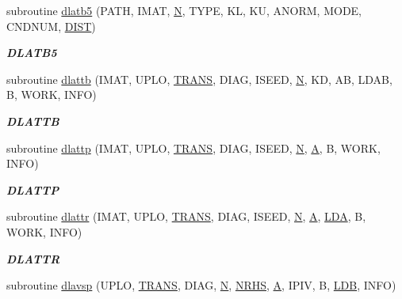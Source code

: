 \begin{DoxyCompactItemize}
subroutine \hyperlink{group__double__lin_ga87397a95770a6cbbe46933bbac6ff7c7}{dlatb5} (P\+A\+T\+H, I\+M\+A\+T, \hyperlink{polmisc_8c_a0240ac851181b84ac374872dc5434ee4}{N}, T\+Y\+P\+E, K\+L, K\+U, A\+N\+O\+R\+M, M\+O\+D\+E, C\+N\+D\+N\+U\+M, \hyperlink{superlu__enum__consts_8h_af00a42ecad444bbda75cde1b64bd7e72ac04fbbdf0d80a4ad25e565541deeebd7}{D\+I\+S\+T})
\begin{DoxyCompactList}\small\item\em {\bfseries D\+L\+A\+T\+B5} \end{DoxyCompactList}\item 
subroutine \hyperlink{group__double__lin_gaef20b8ac00287c0f935b061ebe2c9fdf}{dlattb} (I\+M\+A\+T, U\+P\+L\+O, \hyperlink{superlu__enum__consts_8h_a0c4e17b2d5cea33f9991ccc6a6678d62a1f61e3015bfe0f0c2c3fda4c5a0cdf58}{T\+R\+A\+N\+S}, D\+I\+A\+G, I\+S\+E\+E\+D, \hyperlink{polmisc_8c_a0240ac851181b84ac374872dc5434ee4}{N}, K\+D, A\+B, L\+D\+A\+B, B, W\+O\+R\+K, I\+N\+F\+O)
\begin{DoxyCompactList}\small\item\em {\bfseries D\+L\+A\+T\+T\+B} \end{DoxyCompactList}\item 
subroutine \hyperlink{group__double__lin_ga93a6183a22b3a220dbca5e5b2496ade1}{dlattp} (I\+M\+A\+T, U\+P\+L\+O, \hyperlink{superlu__enum__consts_8h_a0c4e17b2d5cea33f9991ccc6a6678d62a1f61e3015bfe0f0c2c3fda4c5a0cdf58}{T\+R\+A\+N\+S}, D\+I\+A\+G, I\+S\+E\+E\+D, \hyperlink{polmisc_8c_a0240ac851181b84ac374872dc5434ee4}{N}, \hyperlink{classA}{A}, B, W\+O\+R\+K, I\+N\+F\+O)
\begin{DoxyCompactList}\small\item\em {\bfseries D\+L\+A\+T\+T\+P} \end{DoxyCompactList}\item 
subroutine \hyperlink{group__double__lin_ga291d45fd8b1b6b5a6b97fa394fd0affd}{dlattr} (I\+M\+A\+T, U\+P\+L\+O, \hyperlink{superlu__enum__consts_8h_a0c4e17b2d5cea33f9991ccc6a6678d62a1f61e3015bfe0f0c2c3fda4c5a0cdf58}{T\+R\+A\+N\+S}, D\+I\+A\+G, I\+S\+E\+E\+D, \hyperlink{polmisc_8c_a0240ac851181b84ac374872dc5434ee4}{N}, \hyperlink{classA}{A}, \hyperlink{example__user_8c_ae946da542ce0db94dced19b2ecefd1aa}{L\+D\+A}, B, W\+O\+R\+K, I\+N\+F\+O)
\begin{DoxyCompactList}\small\item\em {\bfseries D\+L\+A\+T\+T\+R} \end{DoxyCompactList}\item 
subroutine \hyperlink{group__double__lin_gad76ee5dabf34bd9837af78686f074744}{dlavsp} (U\+P\+L\+O, \hyperlink{superlu__enum__consts_8h_a0c4e17b2d5cea33f9991ccc6a6678d62a1f61e3015bfe0f0c2c3fda4c5a0cdf58}{T\+R\+A\+N\+S}, D\+I\+A\+G, \hyperlink{polmisc_8c_a0240ac851181b84ac374872dc5434ee4}{N}, \hyperlink{example__user_8c_aa0138da002ce2a90360df2f521eb3198}{N\+R\+H\+S}, \hyperlink{classA}{A}, I\+P\+I\+V, B, \hyperlink{example__user_8c_a50e90a7104df172b5a89a06c47fcca04}{L\+D\+B}, I\+N\+F\+O)

\end{DoxyCompactItemize}
